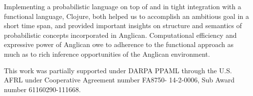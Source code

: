 \documentclass[preprint]{sigplanconf}
\begin{document}
Implementing a probabilistic language on top of and in tight
integration with a functional language, Clojure, both helped
us to accomplish an ambitious goal in a short time span, and
provided important insights on structure and semantics of
probabilistic concepts incorporated in Anglican. Computational
efficiency and expressive power of Anglican owe to adherence to
the functional approach as much as to rich inference
opportunities of the Anglican environment.

\acks

This work was partially supported under DARPA PPAML through the
U.S. AFRL under Cooperative Agreement number FA8750- 14-2-0006,
Sub Award number 61160290-111668.



\end{document}
